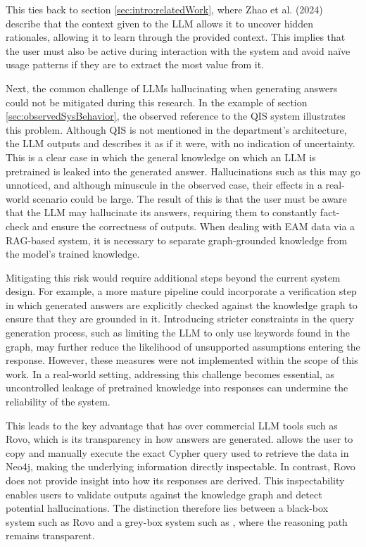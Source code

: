 This ties back to section \ref{sec:intro:relatedWork}, where Zhao et al. (2024) \cite{zhao2024retrieval} describe that the context given to the LLM allows it to uncover hidden rationales, allowing it to learn through the provided context. This implies that the user must also be active during interaction with the system and avoid naïve usage patterns if they are to extract the most value from it.

Next, the common challenge of LLMs hallucinating when generating answers could not be mitigated during this research. In the example of section \ref{sec:observedSysBehavior}, the observed reference to the QIS system illustrates this problem. Although QIS is not mentioned in the department's architecture, the LLM outputs and describes it as if it were, with no indication of uncertainty. This is a clear case in which the general knowledge on which an LLM is pretrained is leaked into the generated answer. Hallucinations such as this may go unnoticed, and although minuscule in the observed case, their effects in a real-world scenario could be large. The result of this is that the user must be aware that the LLM may hallucinate its answers, requiring them to constantly fact-check and ensure the correctness of outputs. When dealing with EAM data via a RAG-based system, it is necessary to separate graph-grounded knowledge from the model's trained knowledge.

Mitigating this risk would require additional steps beyond the current system design. For example, a more mature pipeline could incorporate a verification step in which generated answers are explicitly checked against the knowledge graph to ensure that they are grounded in it. Introducing stricter constraints in the query generation process, such as limiting the LLM to only use keywords found in the graph, may further reduce the likelihood of unsupported assumptions entering the response. However, these measures were not implemented within the scope of this work. In a real-world setting, addressing this challenge becomes essential, as uncontrolled leakage of pretrained knowledge into responses can undermine the reliability of the system.

This leads to the key advantage that \prototype{} has over commercial LLM tools such as Rovo, which is its transparency in how answers are generated. \prototype{} allows the user to copy and manually execute the exact Cypher query used to retrieve the data in Neo4j, making the underlying information directly inspectable. In contrast, Rovo does not provide insight into how its responses are derived. This inspectability enables users to validate outputs against the knowledge graph and detect potential hallucinations. The distinction therefore lies between a black-box system such as Rovo and a grey-box system such as \prototype{}, where the reasoning path remains transparent.

